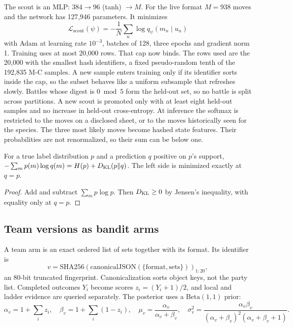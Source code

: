 The scout is an MLP: $384\to96$ (tanh) $\to M$. For the live format $M=938$
moves and the network has 127{,}946 parameters. It minimizes
\begin{equation}
  \mathcal L_{\mathrm{scout}}(\psi)=-\frac1N\sum_{n}\log q_\psi(m_n\mid u_n)
\end{equation}
with Adam at learning rate $10^{-3}$, batches of 128, three epochs and
gradient norm 1. Training uses at most 20{,}000 rows. That cap now binds. The
rows used are the 20{,}000 with the smallest hash identifiers, a fixed
pseudo-random tenth of the 192{,}835 M-C samples. A new sample enters training
only if its identifier sorts inside the cap, so the subset behaves like a
uniform subsample that refreshes slowly. Battles whose digest is $0\bmod5$ form the held-out set, so no
battle is split across partitions. A new scout is promoted only with at least
eight held-out samples and no increase in held-out cross-entropy. At inference
the softmax is restricted to the moves on a disclosed sheet, or to the moves
historically seen for the species. The three most likely moves become hashed
state features. Their probabilities are not renormalized, so their sum can be
below one.

\begin{proposition}
\label{prop:ce}
For a true label distribution $p$ and a prediction $q$ positive on $p$'s
support, $-\sum_mp(m)\log q(m)=H(p)+D_{\mathrm{KL}}(p\Vert q)$. The left side is minimized
exactly at $q=p$.
\end{proposition}
\begin{proof}
Add and subtract $\sum_mp\log p$. Then $D_{\mathrm{KL}}\ge0$ by Jensen's inequality, with
equality only at $q=p$.
\end{proof}


\subsection{Team versions as bandit arms}
A team arm is an exact ordered list of sets together with its format. Its
identifier is
\[
  v=\mathrm{SHA256}(\mathrm{canonicalJSON}(\{\mathrm{format},\mathrm{sets}\}))_{1:20},
\]
an 80-bit truncated fingerprint. Canonicalization sorts object keys, not the
party list. Completed outcomes $Y_i$ become scores $z_i=(Y_i+1)/2$, and local
and ladder evidence are queried separately. The posterior uses a
$\mathrm{Beta}(1,1)$ prior:
\begin{equation}
  \alpha_v=1+\sum_iz_i,\quad\beta_v=1+\sum_i(1-z_i),\quad
  \mu_v=\frac{\alpha_v}{\alpha_v+\beta_v},\quad
  \sigma_v^2=\frac{\alpha_v\beta_v}{(\alpha_v+\beta_v)^2(\alpha_v+\beta_v+1)}.
\label{eq:beta}
\end{equation}

